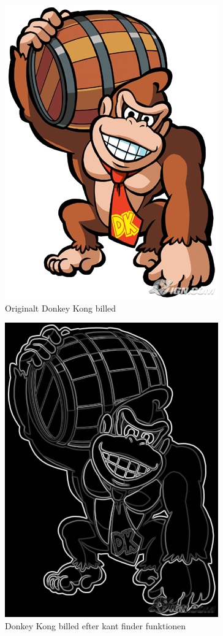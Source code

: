 \begin{figure}
\centering
\includegraphics{Donkey-kong}
\caption{Originalt Donkey Kong billed}
\end{figure}
\begin{figure}
\centering
\includegraphics{Donkey-kong_edges}
\caption{Donkey Kong billed efter kant finder funktionen}
\end{figure}

